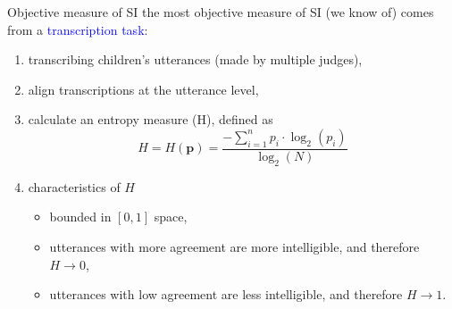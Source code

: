 \begin{frame}
	{Objective measure of SI}
	the \alert{most objective} measure of SI (we know of) comes from a \textcolor{blue}{transcription task}:
	
	\begin{enumerate}
		\item transcribing children's utterances (made by multiple judges),
		\item align transcriptions at the utterance level,
		\item calculate an entropy measure (H), defined as
		\begin{equation*} \label{eq:entropy}
			H = H(\pmb{p}) = \frac{-\sum_{i=1}^{n} p_{i} \cdot \log_{2}(p_{i})}{\log_{2}(N)}
		\end{equation*}
		\item characteristics of $H$ \citep{Boonen_et_al_2021, Faes_et_al_2021} 
		\begin{itemize}
			\item  bounded in $[0,1]$ space,
			\item utterances with more agreement are more intelligible, and therefore $H \rightarrow 0$,
			\item utterances with low agreement are less intelligible, and therefore $H \rightarrow 1$.
		\end{itemize}
	\end{enumerate}
\end{frame}
%
%
